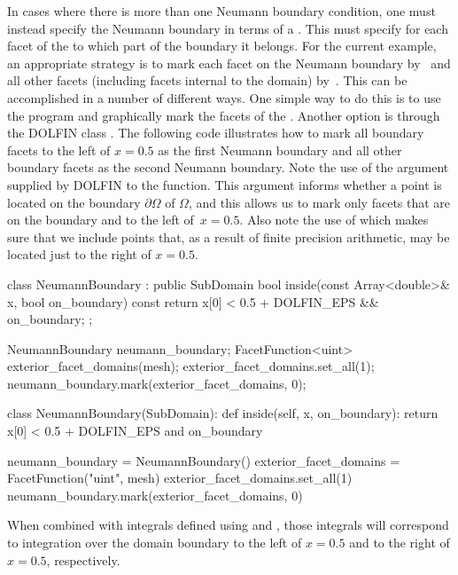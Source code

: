 In cases where there is more than one Neumann boundary condition, one
must instead specify the Neumann boundary in terms of a
. This  must specify for each
facet of the  to which part of the boundary it belongs. For
the current example, an appropriate strategy is to mark each facet on
the Neumann boundary by~ and all other facets (including facets
internal to the domain) by~. This can be accomplished in a
number of different ways. One simple way to do this is to use the
program \citet{www:meshbuilder} and graphically mark the facets of the
. Another option is through the DOLFIN class
. The following code illustrates how to mark all
boundary facets to the left of $x = 0.5$ as the first Neumann boundary and
all other boundary facets as the second Neumann boundary. Note
the use of the  argument supplied by DOLFIN to the
 function. This argument informs whether a point is
located on the boundary $\partial\Omega$ of $\Omega$, and this allows
us to mark only facets that are on the boundary and to the left of~$x
= 0.5$. Also note the use of  which makes sure that
we include points that, as a result of finite precision arithmetic,
may be located just to the right of $x = 0.5$.
\begin{c++}
class NeumannBoundary : public SubDomain
{
  bool inside(const Array<double>& x, bool on_boundary) const
  {
    return x[0] < 0.5 + DOLFIN_EPS && on_boundary;
  }
};

NeumannBoundary neumann_boundary;
FacetFunction<uint> exterior_facet_domains(mesh);
exterior_facet_domains.set_all(1);
neumann_boundary.mark(exterior_facet_domains, 0);
\end{c++}
\begin{python}
class NeumannBoundary(SubDomain):
    def inside(self, x, on_boundary):
        return x[0] < 0.5 + DOLFIN_EPS and on_boundary

neumann_boundary = NeumannBoundary()
exterior_facet_domains = FacetFunction("uint", mesh)
exterior_facet_domains.set_all(1)
neumann_boundary.mark(exterior_facet_domains, 0)
\end{python}
%
When combined with integrals defined using  and
, those integrals will correspond to integration over the
domain boundary to the left of $x = 0.5$ and to the right of $x =
0.5$, respectively.

